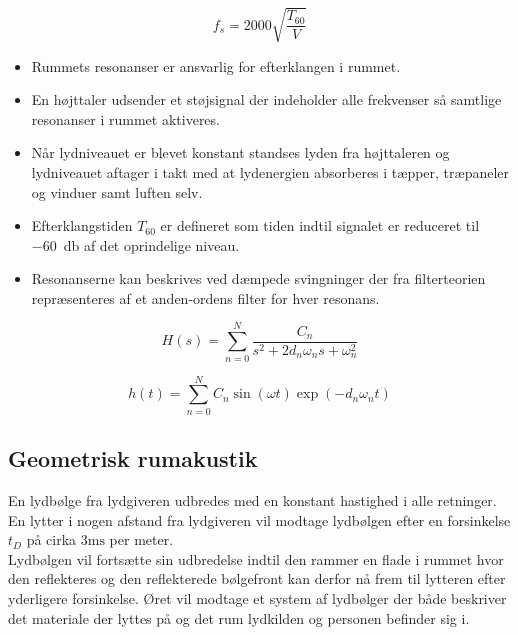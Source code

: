 \begin{equation}
f_s = 2000 \sqrt{\dfrac{T_{60}}{V}}
\end{equation}

\begin{itemize}
	\item Rummets resonanser er ansvarlig for efterklangen i rummet.
	\item En højttaler udsender	et støjsignal der indeholder alle frekvenser så samtlige resonanser i rummet aktiveres. 
	\item Når lydniveauet er blevet konstant standses lyden fra højttaleren og lydniveauet aftager i takt med at lydenergien absorberes i tæpper, træpaneler og vinduer samt luften selv.
	\item Efterklangstiden $T_{60}$ er defineret som tiden indtil signalet er reduceret til \SI{-60}{\decibel} af det oprindelige niveau.
	\item Resonanserne kan beskrives ved dæmpede svingninger der fra filterteorien repræsenteres af et anden-ordens filter for hver resonans.
\end{itemize}

\begin{equation}
H(s)=\sum_{n=0}^{N}\dfrac{C_n}{s^2+2d_n\omega_n s+\omega_n^2}
\end{equation}

\begin{equation}
h(t)=\sum_{n=0}^{N} C_n \sin(\omega t) \exp(-d_n\omega_n t)
\end{equation}

\subsection{Geometrisk rumakustik}
En lydbølge fra lydgiveren udbredes med en konstant hastighed i alle retninger. 
En lytter i nogen afstand fra lydgiveren vil modtage lydbølgen efter en forsinkelse $t_D$ på cirka $3 \si{\milli\second}$ per meter.\\

\noindent Lydbølgen vil fortsætte sin udbredelse indtil den rammer en flade i rummet hvor den reflekteres og den reflekterede bølgefront kan derfor nå frem til lytteren efter yderligere forsinkelse. 
Øret vil modtage et system af lydbølger der både beskriver det materiale der lyttes på og det rum lydkilden og personen befinder sig i.
